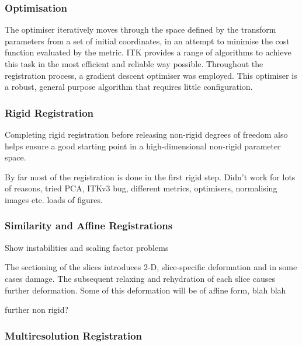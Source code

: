         \subsubsection{Optimisation} %
        \label{sub:optimisation}
          The optimiser iteratively moves through the space defined by the transform parameters from a set of initial coordinates, in an attempt to minimise the cost function evaluated by the metric. ITK provides a range of algorithms to achieve this task in the most efficient and reliable way possible. Throughout the registration process, a gradient descent optimiser was employed. This optimiser is a robust, general purpose algorithm that requires little configuration.

  

    \subsubsection{Rigid Registration} %
    \label{ssub:rigid_registration}
      Completing rigid registration before releasing non-rigid degrees of freedom also helps ensure a good starting point in a high-dimensional non-rigid parameter space. 
  
      By far most of the registration is done in the first rigid step. Didn't work for lots of reasons, tried PCA, ITKv3 bug, different metrics, optimisers, normalising images etc. loads of figures.
    
    \subsubsection{Similarity and Affine Registrations} %
    \label{ssub:similarity_and_affine_registrations}
      Show instabilities and scaling factor problems
    
      The sectioning of the slices introduces 2-D, slice-specific deformation and in some cases damage. The subsequent relaxing and rehydration of each slice causes further deformation. Some of this deformation will be of affine form, blah blah
    
      further non rigid?
    
    
    \subsubsection{Multiresolution Registration} %
    \label{ssub:multiresolution_registration}
    
